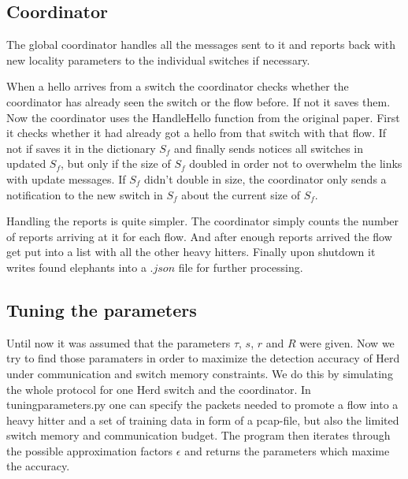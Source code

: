 \documentclass[11pt,oneside,a4paper]{article}
\begin{document}
\subsection{Coordinator} \label{coordinator}
The global coordinator handles all the messages sent to it and reports back with new locality parameters to the individual switches if necessary. 

When a hello arrives from a switch the coordinator checks whether the coordinator has already seen the switch or the flow before. If not it saves them. Now the coordinator uses the HandleHello function from the original paper. First it checks whether it had already got a hello from that switch with that flow. If not if saves it in the dictionary $S_f$ and finally sends notices all switches in updated $S_f$, but only if the size of $S_f$ doubled in order not to overwhelm the links with update messages. If $S_f$ didn't double in size, the coordinator only sends a notification to the new switch in $S_f$ about the current size of $S_f$.

Handling the reports is quite simpler. The coordinator simply counts the number of reports arriving at it for each flow. And after enough reports arrived the flow get put into a list with all the other heavy hitters. Finally upon shutdown it writes found elephants into a $.json$ file for further processing.

\subsection{Tuning the parameters} \label{tuningparameters}
Until now it was assumed that the parameters $\tau$, $s$, $r$ and $R$ were given. Now we try to find those paramaters in order to maximize the detection accuracy of Herd under communication and switch memory constraints. We do this by simulating the whole protocol for one Herd switch and the coordinator. In tuningparameters.py one can specify the packets needed to promote a flow into a heavy hitter and a set of training data in form of a pcap-file, but also the limited switch memory and communication budget. The program then iterates through the possible approximation factors $\epsilon$ and returns the parameters which maxime the accuracy.
\end{document}
